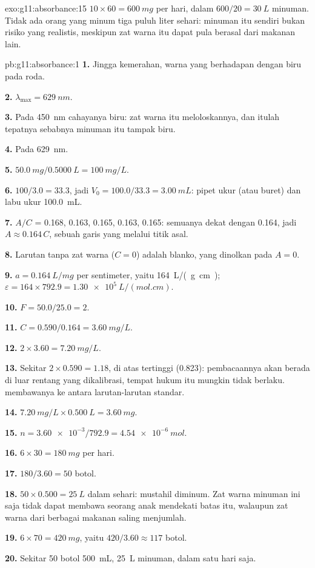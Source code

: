 \begin{solution}{exo:g11:absorbance:15}
$10 \times 60 = \qty{600}{mg}$ per hari, dalam $600 / 20 = \qty{30}{L}$
minuman. Tidak ada orang yang minum tiga puluh liter sehari: minuman itu
sendiri bukan risiko yang realistis, meskipun zat warna itu dapat pula
berasal dari makanan lain.
\end{solution}

\begin{solution}{pb:g11:absorbance:1}
\textbf{1.} Jingga kemerahan, warna yang berhadapan dengan biru pada
roda.

\textbf{2.} $\lambda_{\max} = \qty{629}{nm}$.

\textbf{3.} Pada \qty{450}{nm} cahayanya biru: zat warna itu
meloloskannya, dan itulah tepatnya sebabnya minuman itu tampak biru.

\textbf{4.} Pada \qty{629}{nm}.

\textbf{5.} $\qty{50.0}{mg} / \qty{0.5000}{L} = \qty{100}{mg/L}$.

\textbf{6.}  $100 / 3.0 = 33.3$, jadi
$V_0 = 100.0 / 33.3 = \qty{3.00}{mL}$: pipet ukur (atau buret) dan labu
ukur \qty{100.0}{mL}.

\textbf{7.} $A/C$ = 0.168, 0.163, 0.165, 0.163, 0.165: semuanya dekat
dengan 0.164, jadi $A \approx 0.164\, C$, sebuah garis yang melalui
titik asal.

\textbf{8.} Larutan tanpa zat warna ($C = 0$) adalah blanko, yang
dinolkan pada $A = 0$.

\textbf{9.} $a = \qty{0.164}{L/mg}$ per sentimeter, yaitu
\qty{164}{L/(g.cm)}; $\varepsilon = 164 \times 792.9 =
\qty{1.30e5}{L/(mol.cm)}$.

\textbf{10.} $F = 50.0 / 25.0 = 2$.

\textbf{11.} $C = 0.590 / 0.164 = \qty{3.60}{mg/L}$.

\textbf{12.} $2 \times 3.60 = \qty{7.20}{mg/L}$.

\textbf{13.} Sekitar $2 \times 0.590 = 1.18$, di atas 
tertinggi (0.823): pembacaannya akan berada di luar rentang yang
dikalibrasi, tempat hukum itu mungkin tidak berlaku. 
membawanya ke antara larutan-larutan standar.

\textbf{14.} $\qty{7.20}{mg/L} \times \qty{0.500}{L} = \qty{3.60}{mg}$.

\textbf{15.} $n = \num{3.60e-3} / 792.9 = \qty{4.54e-6}{mol}$.

\textbf{16.} $6 \times 30 = \qty{180}{mg}$ per hari.

\textbf{17.} $180 / 3.60 = 50$ botol.

\textbf{18.} $50 \times 0.500 = \qty{25}{L}$ dalam sehari: mustahil
diminum. Zat warna minuman ini saja tidak dapat membawa seorang anak
mendekati batas itu, walaupun zat warna dari berbagai makanan saling
menjumlah.

\textbf{19.} $6 \times 70 = \qty{420}{mg}$, yaitu $420 / 3.60 \approx
117$ botol.

\textbf{20.} Sekitar 50 botol \qty{500}{mL}, \qty{25}{L} minuman, dalam
satu hari saja.
\end{solution}
